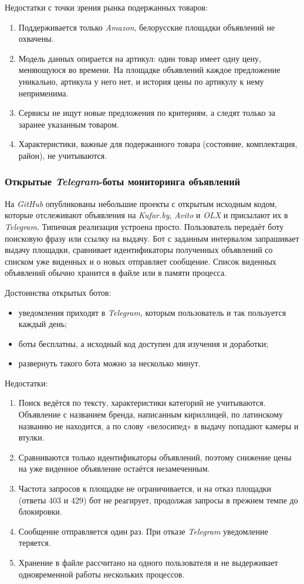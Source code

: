 Недостатки с точки зрения рынка подержанных товаров:
\begin{enumerate}
	\item Поддерживается только \textit{Amazon}, белорусские площадки объявлений не охвачены.
	\item Модель данных опирается на артикул: один товар имеет одну цену, меняющуюся во времени. На площадке объявлений каждое предложение уникально, артикула у него нет, и история цены по артикулу к нему неприменима.
	\item Сервисы не ищут новые предложения по критериям, а следят только за заранее указанным товаром.
	\item Характеристики, важные для подержанного товара (состояние, комплектация, район), не учитываются.
\end{enumerate}

\subsubsection{Открытые \textit{Telegram}-боты мониторинга объявлений}

На \textit{GitHub} опубликованы небольшие проекты с открытым исходным кодом, которые отслеживают объявления на \textit{Kufar.by}, \textit{Avito} и \textit{OLX} и присылают их в \textit{Telegram}. Типичная реализация устроена просто. Пользователь передаёт боту поисковую фразу или ссылку на выдачу. Бот с заданным интервалом запрашивает выдачу площадки, сравнивает идентификаторы полученных объявлений со списком уже виденных и о новых отправляет сообщение. Список виденных объявлений обычно хранится в файле или в памяти процесса.

Достоинства открытых ботов:
\begin{itemize}
	\item уведомления приходят в \textit{Telegram}, которым пользователь и так пользуется каждый день;
	\item боты бесплатны, а исходный код доступен для изучения и доработки;
	\item развернуть такого бота можно за несколько минут.
\end{itemize}

Недостатки:
\begin{enumerate}
	\item Поиск ведётся по тексту, характеристики категорий не учитываются. Объявление с названием бренда, написанным кириллицей, по латинскому названию не находится, а по слову «велосипед» в выдачу попадают камеры и втулки.
	\item Сравниваются только идентификаторы объявлений, поэтому снижение цены на уже виденное объявление остаётся незамеченным.
	\item Частота запросов к площадке не ограничивается, и на отказ площадки (ответы 403 и 429) бот не реагирует, продолжая запросы в прежнем темпе до блокировки.
	\item Сообщение отправляется один раз. При отказе \textit{Telegram} уведомление теряется.
	\item Хранение в файле рассчитано на одного пользователя и не выдерживает одновременной работы нескольких процессов.
\end{enumerate}

